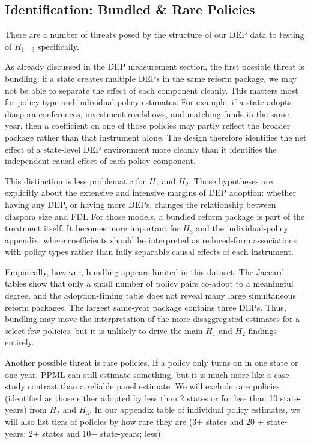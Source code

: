 \documentclass[12pt]{article}
\let\oldsubsection\subsection
\renewcommand{\subsection}{\FloatBarrier\oldsubsection}
\begin{document}
\subsection{Identification: Bundled \& Rare Policies } \label{ss: bundled, rare policies}

There are a number of threats posed by the structure of our DEP data to testing of $H_{1-3}$ specifically.

As already discussed in the DEP measurement section, the first possible threat is bundling: if a state creates multiple DEPs in the same reform package, we may not be able to separate the effect of each component cleanly. This matters most for policy-type and individual-policy estimates. For example, if a state adopts diaspora conferences, investment roadshows, and matching funds in the same year, then a coefficient on one of those policies may partly reflect the broader package rather than that instrument alone. The design therefore identifies the net effect of a state-level DEP environment more cleanly than it identifies the independent causal effect of each policy component.

This distinction is less problematic for $H_1$ and $H_2$. Those hypotheses are explicitly about the extensive and intensive margins of DEP adoption: whether having any DEP, or having more DEPs, changes the relationship between diaspora size and FDI. For those models, a bundled reform package is part of the treatment itself. It becomes more important for $H_3$ and the individual-policy appendix, where coefficients should be interpreted as reduced-form associations with policy types rather than fully separable causal effects of each instrument.

Empirically, however, bundling appears limited in this dataset. The Jaccard tables show that only a small number of policy pairs co-adopt to a meaningful degree, and the adoption-timing table does not reveal many large simultaneous reform packages. The largest same-year package contains three DEPs. Thus, bundling may move the interpretation of the more disaggregated estimates for a select few policies, but it is unlikely to drive the main $H_1$ and $H_2$ findings entirely.



Another possible threat is rare policies. If a policy only turns on in one state or one year, PPML can still estimate something, but it is much more like a case-study contrast than a reliable panel estimate. We will exclude rare policies (identified as those either adopted by less than 2 states or for less than 10 state-years) from $H_2$ and $H_3$. In our appendix table of individual policy estimates, we will also list tiers of policies by how rare they are (3+ states and 20 + state-years; 2+ states and 10+ state-years; less).
\end{document}
